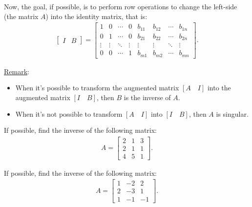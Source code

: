 \documentclass[12pt,a4paper]{article}
\newcounter{example}[section]
\begin{document}
\noindent Now, the goal, if possible, is to perform row operations to change the left-side (the matrix $A$) into the identity matrix, that is:
	\begin{align*}
	\begin{bmatrix}
	I & B
	\end{bmatrix}
	=
	\begin{bmatrix}
	1 & 0 & \cdots & 0 & b_{11} & b_{12} & \cdots & b_{1n} \\
	0 & 1 & \cdots & 0 & b_{21} & b_{22} & \cdots & b_{2n}  \\
	\vdots & \vdots & \ddots & \vdots & \vdots & \vdots & \ddots & \vdots \\
	0 & 0 & \cdots & 1 & b_{m1} & b_{m2} & \cdots & b_{mn}
	\end{bmatrix} .
	\end{align*}

\noindent\underline{Remark}: 
	\begin{itemize}
	\item When it's possible to transform the augmented matrix $[A \quad I ]$ into the augmented matrix $[I \quad B ]$, then $B$ is the inverse of $A$.
	\item When it's not possible to transform $[ A \quad I]$ into $[I \quad B]$, then $A$ is singular. 
	\end{itemize}

\vspace*{16pt}

\begin{example}\label{Example:InvertableMatrix}
If possible, find the inverse of the following matrix:
	\begin{align*}
	A = \begin{bmatrix}
	2 & 1 & 3 \\ 2 & 1 & 1 \\ 4 & 5 & 1
	\end{bmatrix} .
	\end{align*}
\end{example}

\newpage

\phantom{2}

\newpage

\begin{example}
If possible, find the inverse of the following matrix:
	\begin{align*}
	A = \begin{bmatrix}
	1 & -2 & 2 \\
	2 & -3 & 1 \\
	1 & -1 & -1
	\end{bmatrix} .
	\end{align*}
\end{example}
\end{document}
